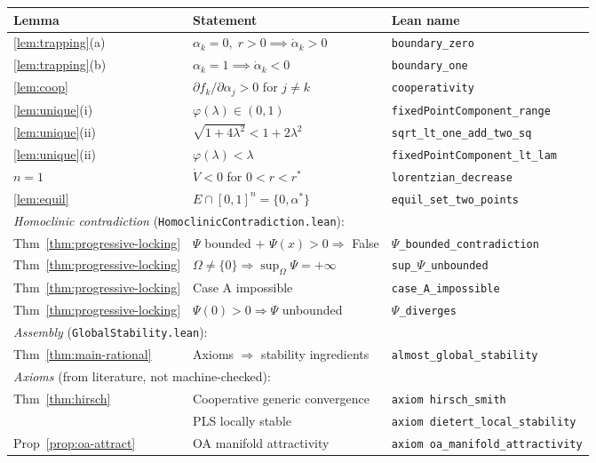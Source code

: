 \documentclass[11pt,a4paper]{article}
\theoremstyle{definition}
\begin{document}
\begin{center}
\begin{tabular}{lll}
\hline
Lemma & Statement & Lean name \\
\hline
\ref{lem:trapping}(a) & $\alpha_k = 0,\;r > 0 \implies \dot{\alpha}_k > 0$ & \texttt{boundary\_zero} \\
\ref{lem:trapping}(b) & $\alpha_k = 1 \implies \dot{\alpha}_k < 0$ & \texttt{boundary\_one} \\
\ref{lem:coop} & $\partial f_k/\partial\alpha_j > 0$ for $j \neq k$ & \texttt{cooperativity} \\
\ref{lem:unique}(i) & $\varphi(\lambda) \in (0,1)$ & \texttt{fixedPointComponent\_range} \\
\ref{lem:unique}(ii) & $\sqrt{1+4\lambda^2} < 1 + 2\lambda^2$ & \texttt{sqrt\_lt\_one\_add\_two\_sq} \\
\ref{lem:unique}(ii) & $\varphi(\lambda) < \lambda$ & \texttt{fixedPointComponent\_lt\_lam} \\
$n=1$ & $\dot{V} < 0$ for $0 < r < r^*$ & \texttt{lorentzian\_decrease} \\
\ref{lem:equil} & $E \cap [0,1]^n = \{0, \alpha^*\}$ & \texttt{equil\_set\_two\_points} \\
\hline
\multicolumn{3}{l}{\emph{Homoclinic contradiction} (\texttt{HomoclinicContradiction.lean}):} \\
\hline
Thm~\ref{thm:progressive-locking} & $\Psi$ bounded $+$ $\Psi(x) > 0 \Rightarrow$ False & \texttt{$\Psi$\_bounded\_contradiction} \\
Thm~\ref{thm:progressive-locking} & $\Omega \neq \{0\} \Rightarrow \sup_\Omega\Psi = +\infty$ & \texttt{sup\_$\Psi$\_unbounded} \\
Thm~\ref{thm:progressive-locking} & Case A impossible & \texttt{case\_A\_impossible} \\
Thm~\ref{thm:progressive-locking} & $\Psi(0) > 0 \Rightarrow \Psi$ unbounded & \texttt{$\Psi$\_diverges} \\
\hline
\multicolumn{3}{l}{\emph{Assembly} (\texttt{GlobalStability.lean}):} \\
\hline
Thm~\ref{thm:main-rational} & Axioms $\Rightarrow$ stability ingredients & \texttt{almost\_global\_stability} \\
\hline
\multicolumn{3}{l}{\emph{Axioms} (from literature, not machine-checked):} \\
\hline
Thm~\ref{thm:hirsch} & Cooperative generic convergence & \texttt{axiom hirsch\_smith} \\
\cite{dietert2017} & PLS locally stable & \texttt{axiom dietert\_local\_stability} \\
Prop~\ref{prop:oa-attract} & OA manifold attractivity & \texttt{axiom oa\_manifold\_attractivity} \\
\hline
\end{tabular}
\end{center}
\end{document}
